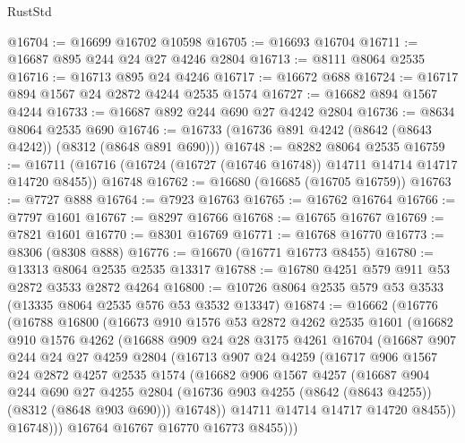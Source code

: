 \begin{lexlean}{RustStd}
\begin{coremodule}
@16704 := @16699 @16702 @10598
@16705 := @16693 @16704
@16711 := @16687 @895 @244 @24 @27 @4246 @2804
@16713 := @8111 @8064 @2535
@16716 := @16713 @895 @24 @4246
@16717 := @16672 @688
@16724 := @16717 @894 @1567 @24 @2872 @4244 @2535 @1574
@16727 := @16682 @894 @1567 @4244
@16733 := @16687 @892 @244 @690 @27 @4242 @2804
@16736 := @8634 @8064 @2535 @690
@16746 := @16733 (@16736 @891 @4242 (@8642 (@8643 @4242)) (@8312 (@8648 @891 @690)))
@16748 := @8282 @8064 @2535
@16759 := @16711 (@16716 (@16724 (@16727 (@16746 @16748)) @14711 @14714 @14717 @14720 @8455)) @16748
@16762 := @16680 (@16685 (@16705 @16759))
@16763 := @7727 @888
@16764 := @7923 @16763
@16765 := @16762 @16764
@16766 := @7797 @1601
@16767 := @8297 @16766
@16768 := @16765 @16767
@16769 := @7821 @1601
@16770 := @8301 @16769
@16771 := @16768 @16770
@16773 := @8306 (@8308 @888)
@16776 := @16670 (@16771 @16773 @8455)
@16780 := @13313 @8064 @2535 @2535 @13317
@16788 := @16780 @4251 @579 @911 @53 @2872 @3533 @2872 @4264
@16800 := @10726 @8064 @2535 @579 @53 @3533 (@13335 @8064 @2535 @576 @53 @3532 @13347)
@16874 := @16662
    (@16776
      (@16788
        @16800
        (@16673
          @910
          @1576
          @53
          @2872
          @4262
          @2535
          @1601
          (@16682
            @910
            @1576
            @4262
            (@16688
              @909
              @24
              @28
              @3175
              @4261
              @16704
              (@16687
                @907
                @244
                @24
                @27
                @4259
                @2804
                (@16713
                  @907
                  @24
                  @4259
                  (@16717
                    @906
                    @1567
                    @24
                    @2872
                    @4257
                    @2535
                    @1574
                    (@16682
                      @906
                      @1567
                      @4257
                      (@16687
                        @904
                        @244
                        @690
                        @27
                        @4255
                        @2804
                        (@16736 @903 @4255 (@8642 (@8643 @4255)) (@8312 (@8648 @903 @690)))
                        @16748))
                    @14711
                    @14714
                    @14717
                    @14720
                    @8455))
                @16748)))
          @16764
          @16767
          @16770
          @16773
          @8455)))

\end{coremodule}
\end{lexlean}
